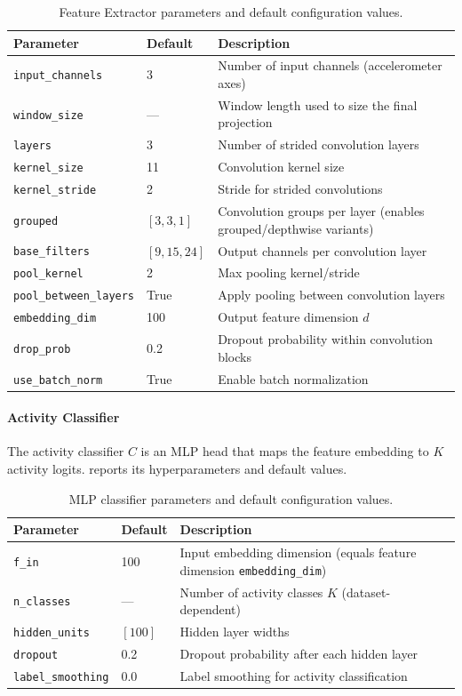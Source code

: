 \begin{table}[!t]
\centering
\caption{Feature Extractor parameters and default configuration values.}
\label{tab:fe-params}
\begin{tabular}{llp{6.5cm}}
\hline
\textbf{Parameter} & \textbf{Default} & \textbf{Description} \\
\hline
\texttt{input\_channels} & 3 & Number of input channels (accelerometer axes) \\
\texttt{window\_size} & --- & Window length used to size the final projection \\
\texttt{layers} & 3 & Number of strided convolution layers \\
\texttt{kernel\_size} & 11 & Convolution kernel size \\
\texttt{kernel\_stride} & 2 & Stride for strided convolutions \\
\texttt{grouped} & $[3, 3, 1]$ & Convolution groups per layer (enables grouped/depthwise variants) \\
\texttt{base\_filters} & $[9, 15, 24]$ & Output channels per convolution layer \\
\texttt{pool\_kernel} & 2 & Max pooling kernel/stride \\
\texttt{pool\_between\_layers} & True & Apply pooling between convolution layers \\
\texttt{embedding\_dim} & 100 & Output feature dimension $d$ \\
\texttt{drop\_prob} & 0.2 & Dropout probability within convolution blocks \\
\texttt{use\_batch\_norm} & True & Enable batch normalization \\
\hline
\end{tabular}
\end{table}

\paragraph{Activity Classifier}
The activity classifier $C$ is an MLP head that maps the feature embedding to $K$ activity logits.  reports its hyperparameters and default values.

\begin{table}[!t]
\centering
\caption{MLP classifier parameters and default configuration values.}
\label{tab:clf-params}
\begin{tabular}{llp{6.5cm}}
\hline
\textbf{Parameter} & \textbf{Default} & \textbf{Description} \\
\hline
\texttt{f\_in} & 100 & Input embedding dimension (equals feature dimension \texttt{embedding\_dim}) \\
\texttt{n\_classes} & --- & Number of activity classes $K$ (dataset-dependent) \\
\texttt{hidden\_units} & $[100]$ & Hidden layer widths \\
\texttt{dropout} & 0.2 & Dropout probability after each hidden layer \\
\texttt{label\_smoothing} & 0.0 & Label smoothing for activity classification \\
\hline
\end{tabular}
\end{table}

